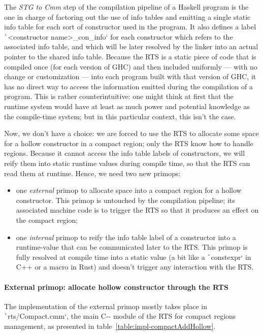 \documentclass[english]{jflart}
\begin{document}
The \emph{STG to Cmm} step of the compilation pipeline of a Haskell program is the one in charge of factoring out the use of info tables and emitting a single static info table for each sort of constructor used in the program. It also defines a label \texttt`<constructor name>_con_info` for each constructor which refers to the associated info table, and which will be later resolved by the linker into an actual pointer to the shared info table. Because the RTS is a static piece of code that is compiled once (for each version of GHC) and then included uniformly --- with no change or customization --- into each program built with that version of GHC, it has no direct way to access the information emitted during the compilation of a program. This is rather counterintuitive: one might think at first that the runtime system would have at least as much power and potential knowledge as the compile-time system; but in this particular context, this isn't the case.

Now, we don't have a choice: we are forced to use the RTS to allocate some space for a hollow constructor in a compact region; only the RTS know how to handle regions. Because it cannot access the info table labels of constructors, we will reify them into static runtime values during compile time, so that the RTS can read them at runtime. Hence, we need two new primops:

\begin{itemize}
\item one \emph{external} primop to allocate space into a compact region for a hollow constructor. This primop is untouched by the compilation pipeline; its associated machine code is to trigger the RTS so that it produces an effect on the compact region;
\item one \emph{internal} primop to reify the info table label of a constructor into a runtime-value that can be communicated later to the RTS. This primop is fully resolved at compile time into a static value (a bit like a \texttt`constexpr` in C++ or a macro in Rust) and doesn't trigger any interaction with the RTS.
\end{itemize}

\paragraph{External primop: allocate hollow constructor through the RTS}

The implementation of the external primop mostly takes place in \texttt`rts/Compact.cmm`, the main C-{}- module of the RTS for compact regions management, as presented in table~\ref{table:impl-compactAddHollow}.
\end{document}
